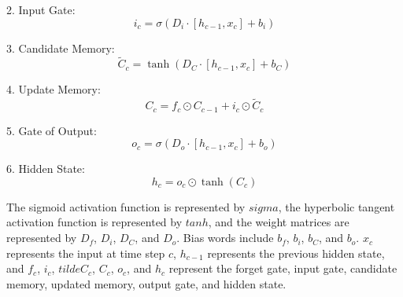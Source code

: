 \documentclass[a4paper,fleqn]{cas-sc}
\begin{document}
2. Input Gate:
\begin{equation}
i_c = \sigma(D_i \cdot [h_{c-1}, x_c] + b_i)
\end{equation}

3. Candidate Memory:
\begin{equation}
\tilde{C}_c = \tanh(D_C \cdot [h_{c-1}, x_c] + b_C)
\end{equation}

4. Update Memory:
\begin{equation}
C_c = f_c \odot C_{c-1} + i_c \odot \tilde{C}_c
\end{equation}

5. Gate of Output:
\begin{equation}
o_c = \sigma(D_o \cdot [h_{c-1}, x_c] + b_o)
\end{equation}

6. Hidden State:
\begin{equation}
h_c = o_c \odot \tanh(C_c)
\end{equation}

The sigmoid activation function is represented by $sigma$, the hyperbolic tangent activation function is represented by $tanh$, and the weight matrices are represented by $D_f$, $D_i$, $D_C$, and $D_o$. Bias words include $b_f$, $b_i$, $b_C$, and $b_o$. $x_c$ represents the input at time step $c$, $h_{c-1}$ represents the previous hidden state, and $f_c$, $i_c$, $tilde{C}_c$, $C_c$, $o_c$, and $h_c$ represent the forget gate, input gate, candidate memory, updated memory, output gate, and hidden state.
\end{document}
